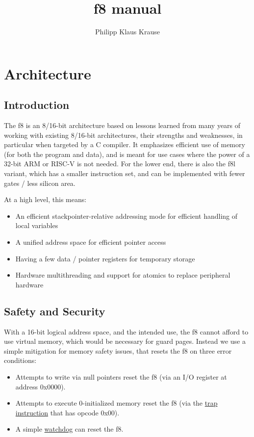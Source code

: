 \documentclass{book}
\title{f8 manual}
\author{Philipp Klaus Krause}
\begin{document}
\maketitle

\chapter{Architecture}

\section{Introduction}

The f8 is an 8/16-bit architecture based on lessons learned from many years of working with existing 8/16-bit architectures, their strengths and weaknesses, in particular when targeted by a C compiler. It emphasizes efficient use of memory (for both the program and data), and is meant for use cases where the power of a 32-bit ARM or RISC-V is not needed. For the lower end, there is also the f8l variant, which has a smaller instruction set, and can be implemented with fewer gates / less silicon area.

At a high level, this means:

\begin{itemize}
\item An efficient stackpointer-relative addressing mode for efficient handling of local variables
\item A unified address space for efficient pointer access
\item Having a few data / pointer registers for temporary storage
\item Hardware multithreading and support for atomics to replace peripheral hardware
\end{itemize}

\section{Safety and Security}

With a 16-bit logical address space, and the intended use, the f8 cannot afford to use virtual memory, which would be necessary for guard pages. Instead we use a simple mitigation for memory safety issues, that resets the f8 on three error conditions:

\begin{itemize}
\item Attempts to write via null pointers reset the f8 (via an I/O register at address 0x0000).
\item Attempts to execute 0-initialized memory reset the f8 (via the \hyperref[inst:trap]{trap instruction} that has opcode 0x00).
\item A simple  \hyperref[periph:watchdog]{watchdog} can reset the f8.
\end{itemize}
\end{document}
